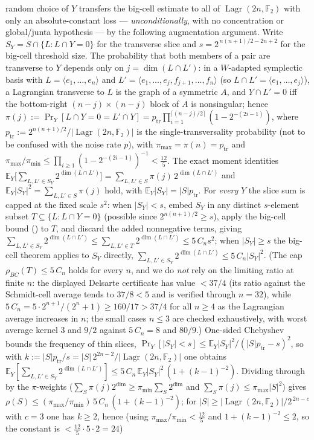 \documentclass[11pt,a4paper]{article}
\theoremstyle{plain}
\theoremstyle{definition}
\newcommand{\F}{\mathbb{F}}
\DeclareMathOperator{\Lagr}{Lagr}
\begin{document}
random choice of $Y$ transfers the big-cell estimate to all of $\Lagr(2n,\F_2)$ with only an absolute-constant loss --- \emph{unconditionally}, with no concentration or global/junta hypothesis --- by the following augmentation argument. Write $S_Y=S\cap\{L:L\cap Y=0\}$ for the transverse slice and $s=2^{\,n(n+1)/2-2n+2}$ for the big-cell threshold size. The probability that both members of a pair are transverse to $Y$ depends only on $j=\dim(L\cap L')$: in a $W$-adapted symplectic basis with $L=\langle e_1,\dots,e_n\rangle$ and $L'=\langle e_1,\dots,e_j,f_{j+1},\dots,f_n\rangle$ (so $L\cap L'=\langle e_1,\dots,e_j\rangle$), a Lagrangian transverse to $L$ is the graph of a symmetric $A$, and $Y\cap L'=0$ iff the bottom-right $(n-j)\times(n-j)$ block of $A$ is nonsingular; hence $\pi(j):=\Pr_Y[L\cap Y=0=L'\cap Y]=p_{\mathrm{tr}}\prod_{i=1}^{\lceil(n-j)/2\rceil}(1-2^{-(2i-1)})$, where $p_{\mathrm{tr}}:=2^{n(n+1)/2}/|\Lagr(2n,\F_2)|$ is the single-transversality probability (not to be confused with the noise rate $p$), with $\pi_{\max}=\pi(n)=p_{\mathrm{tr}}$ and $\pi_{\max}/\pi_{\min}\le\prod_{i\ge1}(1-2^{-(2i-1)})^{-1}<\tfrac{12}{5}$. The exact moment identities $\mathbb E_Y\big[\sum_{L,L'\in S_Y}2^{\dim(L\cap L')}\big]=\sum_{L,L'\in S}\pi(j)\,2^{\dim(L\cap L')}$ and $\mathbb E_Y|S_Y|^2=\sum_{L,L'\in S}\pi(j)$ hold, with $\mathbb E_Y|S_Y|=|S|p_{\mathrm{tr}}$. For \emph{every} $Y$ the slice sum is capped at the fixed scale $s^2$: when $|S_Y|<s$, embed $S_Y$ in any distinct $s$-element subset $T\subseteq\{L:L\cap Y=0\}$ (possible since $2^{n(n+1)/2}\ge s$), apply the big-cell bound () to $T$, and discard the added nonnegative terms, giving $\sum_{L,L'\in S_Y}2^{\dim(L\cap L')}\le\sum_{L,L'\in T}2^{\dim(L\cap L')}\le5\,C_ns^2$; when $|S_Y|\ge s$ the big-cell theorem applies to $S_Y$ directly, $\sum_{L,L'\in S_Y}2^{\dim(L\cap L')}\le5\,C_n|S_Y|^2$. (The cap $\rho_{BC}(T)\le5\,C_n$ holds for every $n$, and we do \emph{not} rely on the limiting ratio at finite $n$: the displayed Delsarte certificate has value $<37/4$ (its ratio against the Schmidt-cell average tends to $37/8<5$ and is verified through $n=32$), while $5\,C_n=5\cdot2^{n+1}/(2^n+1)\ge160/17>37/4$ for all $n\ge4$ as the Lagrangian average increases in $n$; the small cases $n\le3$ are checked exhaustively, with worst average kernel $3$ and $9/2$ against $5\,C_n=8$ and $80/9$.) One-sided Chebyshev bounds the frequency of thin slices, $\Pr_Y[|S_Y|<s]\le\mathbb E_Y|S_Y|^2/(|S|p_{\mathrm{tr}}-s)^2$, so with $k:=|S|p_{\mathrm{tr}}/s=|S|\,2^{2n-2}/|\Lagr(2n,\F_2)|$ one obtains $\mathbb E_Y[\sum_{L,L'\in S_Y}2^{\dim(L\cap L')}]\le5\,C_n\,\mathbb E_Y|S_Y|^2\,(1+(k-1)^{-2})$. Dividing through by the $\pi$-weights ($\sum_S\pi(j)2^{\dim}\ge\pi_{\min}\sum_S2^{\dim}$ and $\sum_S\pi(j)\le\pi_{\max}|S|^2$) gives $\rho(S)\le(\pi_{\max}/\pi_{\min})\,5\,C_n\,(1+(k-1)^{-2})$; for $|S|\ge|\Lagr(2n,\F_2)|/2^{\,2n-c}$ with $c=3$ one has $k\ge2$, hence (using $\pi_{\max}/\pi_{\min}<\tfrac{12}{5}$ and $1+(k-1)^{-2}\le2$, so the constant is $<\tfrac{12}{5}\cdot5\cdot2=24$)
\end{document}
